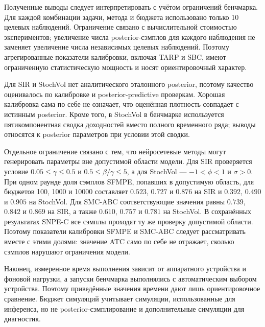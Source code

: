 Полученные выводы следует интерпретировать с учётом ограничений
бенчмарка. Для каждой комбинации задачи, метода и бюджета использовано
только 10 целевых наблюдений. Ограничение связано с вычислительной
стоимостью экспериментов; увеличение числа posterior-сэмплов для каждого
наблюдения не заменяет увеличение числа независимых целевых наблюдений.
Поэтому агрегированные показатели калибровки, включая TARP и SBC, имеют
ограниченную статистическую мощность и носят ориентировочный характер.

Для SIR и StochVol нет аналитического эталонного posterior, поэтому
качество оценивалось по калибровке и posterior-predictive проверкам.
Хорошая калибровка сама по себе не означает, что оценённая плотность
совпадает с истинным posterior. Кроме того, в StochVol в бенчмарке
используется пятикомпонентная сводка доходностей вместо полного временного
ряда; выводы относятся к posterior параметров при условии этой сводки.

Отдельное ограничение связано с тем, что нейросетевые методы могут
генерировать параметры вне допустимой области модели. Для SIR проверяется
условие $0.05\leq\gamma\leq0.5$ и $0.5\leq\beta/\gamma\leq5$, а для
StochVol --- $-1<\phi<1$ и $\sigma>0$. При одном раунде доля сэмплов
SFMPE, попавших в допустимую область, для бюджетов 100, 1000 и 10000
составляет
$0.523$, $0.727$ и $0.876$ на SIR и $0.392$, $0.490$ и $0.905$ на
StochVol. Для SMC-ABC соответствующие значения равны $0.739$, $0.842$ и
$0.869$ на SIR, а также $0.610$, $0.757$ и $0.781$ на StochVol. В
сохранённых результатах SNPE-C все сэмплы проходят ту же проверку
допустимой области. Поэтому показатели калибровки SFMPE и SMC-ABC следует
рассматривать вместе с этими долями: значение ATC само по себе не
отражает, сколько сэмплов нарушают ограничения модели.

Наконец, измеренное время выполнения зависит от аппаратного устройства
и фоновой нагрузки, а запуски бенчмарка выполнялись с автоматическим
выбором устройства. Поэтому приведённые значения времени дают лишь
ориентировочное сравнение. Бюджет симуляций учитывает симуляции,
использованные для инференса, но не posterior-сэмплирование и
дополнительные симуляции для диагностик.